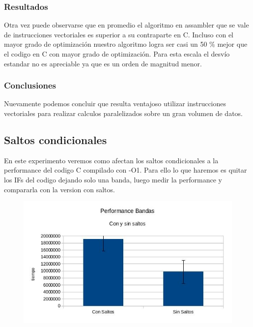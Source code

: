 \documentclass[a4paper]{article}
\begin{document}
\subsubsection{Resultados}
Otra vez puede observarse que en promedio el algoritmo en assambler que se vale de instrucciones vectoriales es superior a su contraparte en C. Incluso con el mayor grado de optimización nuestro algoritmo logra ser casi un 50 \% mejor que el codigo en C con mayor grado de optimización. Para esta escala el desvío estandar no es apreciable ya que es un orden de magnitud menor.

\subsubsection{Conclusiones}

Nuevamente podemos concluir que resulta ventajoso utilizar instrucciones vectoriales para realizar calculos paralelizados sobre un gran volumen de datos.

\newpage
\subsection{Saltos condicionales}

En este experimento veremos como afectan los saltos condicionales a la performance del codigo C compilado con -O1. Para ello lo que haremos es quitar los IFs del codigo dejando solo una banda, luego medir la performance y compararla con la version con saltos.

\begin{figure}[h!]
  \begin{center}
  \includegraphics[scale=0.66]{Graficos3.1/per.jpg}
  \label{nombreparareferenciar1}
  \end{center}
\end{figure}
\end{document}
